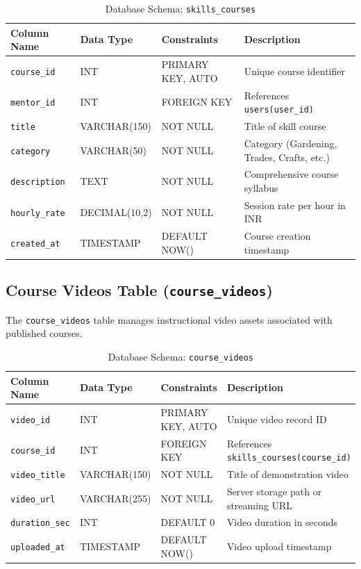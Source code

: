 \documentclass[12pt,a4paper]{report}
\begin{document}
\begin{table}[H]
\centering
\small
\caption{Database Schema: \texttt{skills\_courses}}
\label{tab:schema_skills_courses}
\begin{tabularx}{\textwidth}{|L{3.0cm}|L{2.8cm}|L{2.5cm}|J|}
\hline
\textbf{Column Name} & \textbf{Data Type} & \textbf{Constraints} & \textbf{Description} \\ \hline
\texttt{course\_id} & INT & PRIMARY KEY, AUTO & Unique course identifier \\ \hline
\texttt{mentor\_id} & INT & FOREIGN KEY & References \texttt{users(user\_id)} \\ \hline
\texttt{title} & VARCHAR(150) & NOT NULL & Title of skill course \\ \hline
\texttt{category} & VARCHAR(50) & NOT NULL & Category (Gardening, Trades, Crafts, etc.) \\ \hline
\texttt{description} & TEXT & NOT NULL & Comprehensive course syllabus \\ \hline
\texttt{hourly\_rate} & DECIMAL(10,2) & NOT NULL & Session rate per hour in INR \\ \hline
\texttt{created\_at} & TIMESTAMP & DEFAULT NOW() & Course creation timestamp \\ \hline
\end{tabularx}
\end{table}

\subsection{Course Videos Table (\texttt{course\_videos})}
The \texttt{course\_videos} table manages instructional video assets associated with published courses.

\begin{table}[H]
\centering
\small
\caption{Database Schema: \texttt{course\_videos}}
\label{tab:schema_course_videos}
\begin{tabularx}{\textwidth}{|L{3.0cm}|L{2.8cm}|L{2.5cm}|J|}
\hline
\textbf{Column Name} & \textbf{Data Type} & \textbf{Constraints} & \textbf{Description} \\ \hline
\texttt{video\_id} & INT & PRIMARY KEY, AUTO & Unique video record ID \\ \hline
\texttt{course\_id} & INT & FOREIGN KEY & References \texttt{skills\_courses(course\_id)} \\ \hline
\texttt{video\_title} & VARCHAR(150) & NOT NULL & Title of demonstration video \\ \hline
\texttt{video\_url} & VARCHAR(255) & NOT NULL & Server storage path or streaming URL \\ \hline
\texttt{duration\_sec} & INT & DEFAULT 0 & Video duration in seconds \\ \hline
\texttt{uploaded\_at} & TIMESTAMP & DEFAULT NOW() & Video upload timestamp \\ \hline
\end{tabularx}
\end{table}
\end{document}

